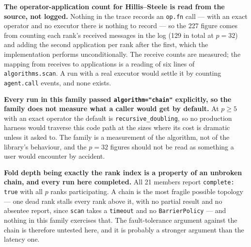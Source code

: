 \documentclass[11pt]{article}
\begin{document}
\textbf{The operator-application count for Hillis--Steele is read from the source, not logged.}
Nothing in the trace records an \texttt{op.fn} call --- with an exact operator and no executor
there is nothing to record --- so the 227 figure comes from counting each rank's received messages
in the log (129 in total at $p=32$) and adding the second application per rank after the first,
which the implementation performs unconditionally. The receive counts are measured; the mapping
from receives to applications is a reading of six lines of \texttt{algorithms.scan}. A run with a
real executor would settle it by counting \texttt{agent.call} events, and none exists.

\textbf{Every run in this family passed \texttt{algorithm="chain"} explicitly, so the family does
not measure what a caller would get by default.} At $p \ge 5$ with an exact operator the default is
\texttt{recursive\_doubling}, so no production harness would traverse this code path at the sizes
where its cost is dramatic unless it asked to. The family is a measurement of the algorithm, not
of the library's behaviour, and the $p=32$ figures should not be read as something a user would
encounter by accident.

\textbf{Fold depth being exactly the rank index is a property of an unbroken chain, and every run
here completed.} All 21 members report \texttt{complete: true} with all $p$ ranks participating. A
chain is the most fragile possible topology --- one dead rank stalls every rank above it, with no
partial result and no absentee report, since \texttt{scan} takes a \texttt{timeout} and no
\texttt{BarrierPolicy} --- and nothing in this family exercises that. The fault-tolerance argument
against the chain is therefore untested here, and it is probably a stronger argument than the
latency one.
\end{document}

